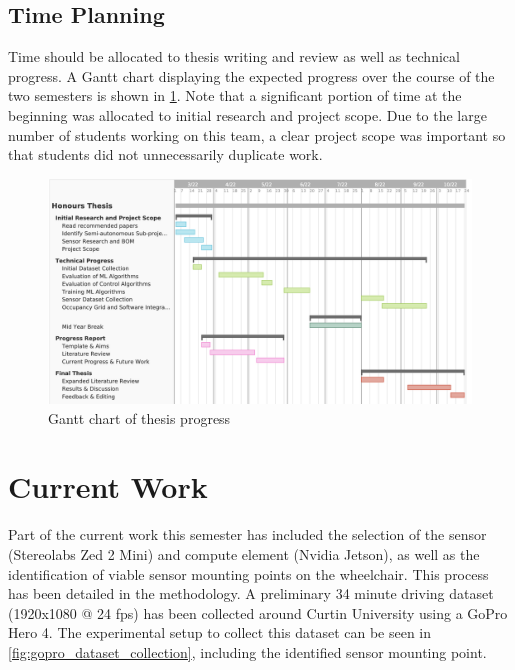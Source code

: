\documentclass[12pt]{article}
\begin{document}
\subsection{Time Planning}
Time should be allocated to thesis writing and review as well as technical progress.
A Gantt chart displaying the expected progress over the course of the two semesters
is shown in \cref{fig:gantt_chart}. Note that a significant portion of time at the beginning was allocated
to initial research and project scope. Due to the large number of students working on this team,
a clear project scope was important so that students did not unnecessarily duplicate work.

\begin{figure}[H]
    \centering
    \includegraphics[width=\linewidth]{images/gantt_chart.png}
    \caption{Gantt chart of thesis progress}
    \label{fig:gantt_chart}
\end{figure}
\pagebreak





\section{Current Work}
Part of the current work this semester has included the selection of the sensor (Stereolabs Zed 2 Mini) and compute element (Nvidia Jetson),
as well as the identification of viable sensor mounting points on the wheelchair. This process has been detailed in the methodology.
A preliminary 34 minute driving dataset (1920x1080 @ 24 fps) has been collected around Curtin University using a GoPro Hero 4.
The experimental setup to collect this dataset can be seen in \cref{fig:gopro_dataset_collection}, including the identified
sensor mounting point.
\end{document}
